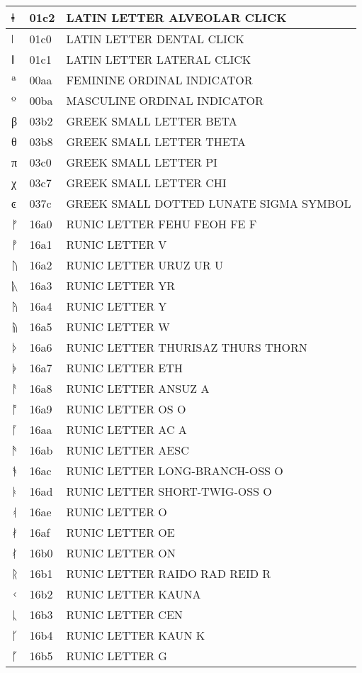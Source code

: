 \documentclass[12pt,letterpaper,openany]{book}
\begin{document}
\begin{center}
\begin{supertabular}{|m{0.25in}|m{0.5in}|m{4in}|}
ǂ & 01c2 & LATIN LETTER ALVEOLAR CLICK\\\hline
ǀ & 01c0 & LATIN LETTER DENTAL CLICK\\\hline
ǁ & 01c1 & LATIN LETTER LATERAL CLICK\\\hline
ª & 00aa & FEMININE ORDINAL INDICATOR\\\hline
º & 00ba & MASCULINE ORDINAL INDICATOR\\\hline
β & 03b2 & GREEK SMALL LETTER BETA\\\hline
θ & 03b8 & GREEK SMALL LETTER THETA\\\hline
π & 03c0 & GREEK SMALL LETTER PI\\\hline
χ & 03c7 & GREEK SMALL LETTER CHI\\\hline
ͼ & 037c & GREEK SMALL DOTTED LUNATE SIGMA SYMBOL\\\hline
ᚠ & 16a0 & RUNIC LETTER FEHU FEOH FE F\\\hline
ᚡ & 16a1 & RUNIC LETTER V\\\hline
ᚢ & 16a2 & RUNIC LETTER URUZ UR U\\\hline
ᚣ & 16a3 & RUNIC LETTER YR\\\hline
ᚤ & 16a4 & RUNIC LETTER Y\\\hline
ᚥ & 16a5 & RUNIC LETTER W\\\hline
ᚦ & 16a6 & RUNIC LETTER THURISAZ THURS THORN\\\hline
ᚧ & 16a7 & RUNIC LETTER ETH\\\hline
ᚨ & 16a8 & RUNIC LETTER ANSUZ A\\\hline
ᚩ & 16a9 & RUNIC LETTER OS O\\\hline
ᚪ & 16aa & RUNIC LETTER AC A\\\hline
ᚫ & 16ab & RUNIC LETTER AESC\\\hline
ᚬ & 16ac & RUNIC LETTER LONG-BRANCH-OSS O\\\hline
ᚭ & 16ad & RUNIC LETTER SHORT-TWIG-OSS O\\\hline
ᚮ & 16ae & RUNIC LETTER O\\\hline
ᚯ & 16af & RUNIC LETTER OE\\\hline
ᚰ & 16b0 & RUNIC LETTER ON\\\hline
ᚱ & 16b1 & RUNIC LETTER RAIDO RAD REID R\\\hline
ᚲ & 16b2 & RUNIC LETTER KAUNA\\\hline
ᚳ & 16b3 & RUNIC LETTER CEN\\\hline
ᚴ & 16b4 & RUNIC LETTER KAUN K\\\hline
ᚵ & 16b5 & RUNIC LETTER G\\\hline

\end{supertabular}
\end{center}
\end{document}
